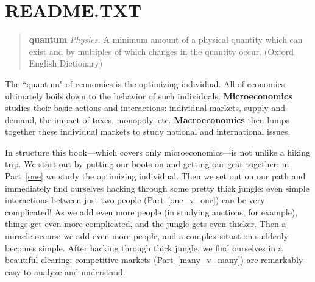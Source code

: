%

\chapter{README.TXT}
\label{intro}


\begin{quote}
\textbf{quantum } \textit{Physics.} A minimum amount of a physical quantity which can exist and by multiples of which changes in the quantity occur. (Oxford English Dictionary)
\end{quote}

\vspace*{.4cm}

\noindent The ``quantum" of economics is the optimizing individual. All of economics ultimately boils down to the behavior of such individuals. \textbf{Microeconomics} studies their basic actions and interactions: individual markets, supply and demand, the impact of taxes, monopoly, etc. \textbf{Macroeconomics} then lumps together these individual markets to study national and international issues.

In structure this book---which covers only microeconomics---is not unlike a hiking trip. We start out by putting our boots on and getting our gear together: in Part~\ref{one} we study the optimizing individual. Then we set out on our path and immediately find ourselves hacking through some pretty thick jungle: even simple interactions between just two people (Part~\ref{one_v_one}) can be very complicated! As we add even more people (in studying auctions, for example), things get even more complicated, and the jungle gets even thicker. Then a miracle occurs: we add even more people, and a complex situation suddenly becomes simple. After hacking through thick jungle, we find ourselves in a beautiful clearing: competitive markets (Part~\ref{many_v_many}) are remarkably easy to analyze and understand.


